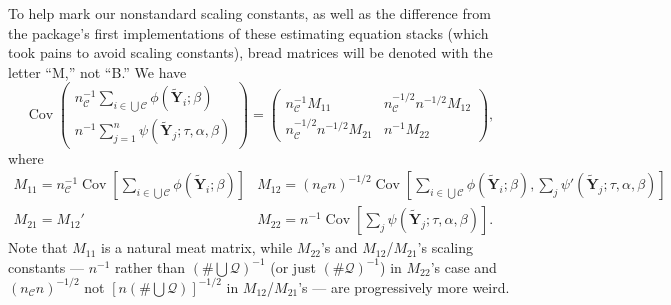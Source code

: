 \documentclass{article}
\begin{document}
To help mark our nonstandard scaling constants, as well as the difference from the package's first implementations of these estimating equation stacks (which took pains to avoid scaling constants), 
bread matrices will be denoted with the letter ``M,'' not ``B.''
We have
\[
\operatorname{Cov}\left(
     \begin{array}{c}
       n_{\mathcal{C}}^{-1}\sum_{i\in \bigcup \mathcal{C}}\phi(\tilde{\mathbf{Y}}_{i}; \beta )\\
       n^{-1}\sum_{j=1}^{n}\psi(\tilde{\mathbf{Y}}_{j}; \tau, \alpha, \beta )
     \end{array}
\right) = \left(
  \begin{array}{cc}
    n_{\mathcal{C}}^{-1}M_{11}& n_{\mathcal{C}}^{-1/2}n^{-1/2} M_{12}\\
    n_{\mathcal{C}}^{-1/2}n^{-1/2} M_{21} & n^{-1}M_{22}
  \end{array}
\right),
\]
where
\[
  \begin{array}{cc}
    M_{11}  = n_{\mathcal{C}}^{-1}\operatorname{Cov}[\sum_{i\in \bigcup
             \mathcal{C}} \phi(\tilde{\mathbf{Y}}_{i}; \beta )] &
                                                                  M_{12}=
                                                                  (n_{\mathcal{C}}n)^{-1/2} \operatorname{Cov}[\sum_{i\in \bigcup
             \mathcal{C}}\phi(\tilde{\mathbf{Y}}_{i};
                                                                  \beta
                                                                  ), \sum_{j}\psi'(\tilde{\mathbf{Y}}_{j}; \tau, \alpha, \beta )]\\
    M_{21}=M_{12}' & M_{22} = n^{-1}\operatorname{Cov}[\sum_{j}\psi(\tilde{\mathbf{Y}}_{j};
                     \tau, \alpha, \beta )] .
    \end{array}
\]
Note that $M_{11}$ is a natural meat matrix, while $M_{22}$'s and
$M_{12}$/$M_{21}$'s scaling constants --- $n^{-1}$ rather than $(\# \bigcup
\mathcal{Q})^{-1}$ (or just $(\# \mathcal{Q})^{-1}$) in $M_{22}$'s
case and $(n_{\mathcal{C}}n)^{-1/2}$ not $[n (\# \bigcup
\mathcal{Q})]^{-1/2}$ in $M_{12}$/$M_{21}$'s --- are progressively more weird.
\end{document}
